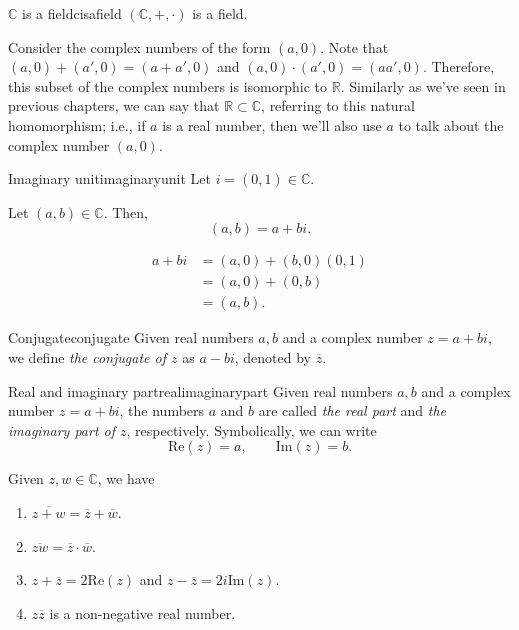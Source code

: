 \begin{prop}{\(\mathbb{C}\) is a field}{cisafield}
	\((\mathbb{C}, +, \cdot)\) is a field.
\end{prop}

Consider the complex numbers of the form \((a, 0)\).
Note that \((a, 0) + (a', 0) = (a + a', 0)\) and  \((a, 0) \cdot (a', 0) = (aa', 0)\).
Therefore, this subset of the complex numbers is isomorphic to \(\mathbb{R}\).
Similarly as we've seen in previous chapters, we can say that \(\mathbb{R} \subset \mathbb{C}\), referring to this natural homomorphism; i.e., if \(a\) is a real number, then we'll also use \(a\) to talk about the complex number \((a, 0)\).

\begin{defn}{Imaginary unit}{imaginaryunit}
	Let \(i = (0, 1) \in \mathbb{C}\).
\end{defn}

\begin{prop}{}{}
	Let \((a, b) \in \mathbb{C}\). Then, \[
		(a, b) = a + bi.
	\]
\end{prop}

\begin{dem}{}{}
	\begin{align*}
		a + bi &= (a, 0) + (b, 0)(0, 1) \\
			   &= (a, 0) + (0, b) \\
			   &= (a, b).
	\end{align*}
\end{dem}

\begin{defn}{Conjugate}{conjugate}
	Given real numbers \(a, b\) and a complex number \(z = a + bi\), we define \emph{the conjugate of \(z\)} as \(a - bi\), denoted by \(\overline z\).
\end{defn}

\begin{defn}{Real and imaginary part}{realimaginarypart}
	Given real numbers \(a, b\) and a complex number \(z = a + bi\), the numbers \(a\) and \(b\) are called \emph{the real part} and \emph{the imaginary part of \(z\)}, respectively. Symbolically, we can write \[
		\mathrm{Re}(z) = a, \qquad \mathrm{Im}(z) = b.
	\]
\end{defn}

\begin{prop}{}{}
	Given \(z, w \in \mathbb{C}\), we have
	\begin{enumerate}[label = \textbullet]
		\item \(\overline{z + w} = \overline z + \overline w\).
		\item \(\overline{zw} = \overline z \cdot \overline w\).
		\item \(z + \overline z = 2 \mathrm{Re}(z)\) and  \(z - \overline{z} = 2i \mathrm{Im}(z)\).
		\item \(z \overline z\) is a non-negative real number.
	\end{enumerate}
\end{prop}


